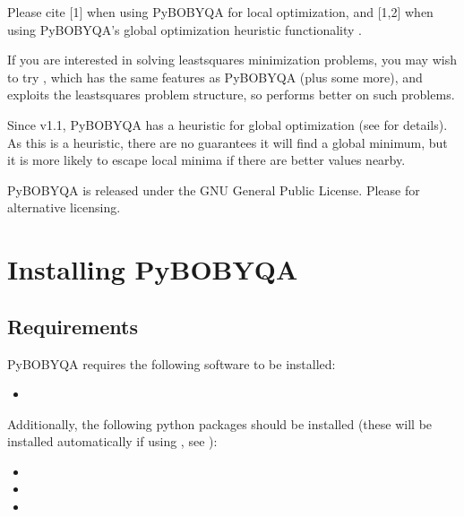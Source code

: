 \documentclass[letterpaper,10pt,english]{sphinxmanual}
\begin{document}
Please cite {[}1{]} when using Py\sphinxhyphen{}BOBYQA for local optimization, and {[}1,2{]} when using Py\sphinxhyphen{}BOBYQA’s global optimization heuristic functionality .

If you are interested in solving least\sphinxhyphen{}squares minimization problems, you may wish to try , which has the same features as Py\sphinxhyphen{}BOBYQA (plus some more), and exploits the least\sphinxhyphen{}squares problem structure, so performs better on such problems.

Since v1.1, Py\sphinxhyphen{}BOBYQA has a heuristic for global optimization (see {\hyperref[\detokenize{userguide::doc}]{}} for details). As this is a heuristic, there are no guarantees it will find a global minimum, but it is more likely to escape local minima if there are better values nearby.

Py\sphinxhyphen{}BOBYQA is released under the GNU General Public License. Please  for alternative licensing.


\chapter{Installing Py\sphinxhyphen{}BOBYQA}
\label{\detokenize{install:installing-py-bobyqa}}\label{\detokenize{install::doc}}

\section{Requirements}
\label{\detokenize{install:requirements}}
Py\sphinxhyphen{}BOBYQA requires the following software to be installed:
\begin{itemize}
\item {} 

\end{itemize}

Additionally, the following python packages should be installed (these will be installed automatically if using , see {\hyperref[\detokenize{install:installation-using-pip}]{}}):
\begin{itemize}
\item {} 

\item {} 

\item {} 

\end{itemize}
\end{document}
